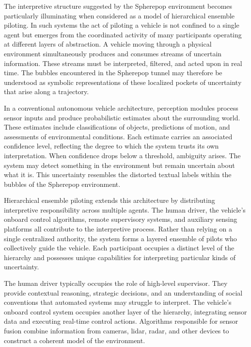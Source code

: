 \documentclass[11pt]{article}
\begin{document}
The interpretive structure suggested by the Spherepop environment becomes particularly illuminating when considered as a model of hierarchical ensemble piloting. In such systems the act of piloting a vehicle is not confined to a single agent but emerges from the coordinated activity of many participants operating at different layers of abstraction. A vehicle moving through a physical environment simultaneously produces and consumes streams of uncertain information. These streams must be interpreted, filtered, and acted upon in real time. The bubbles encountered in the Spherepop tunnel may therefore be understood as symbolic representations of these localized pockets of uncertainty that arise along a trajectory.

In a conventional autonomous vehicle architecture, perception modules process sensor inputs and produce probabilistic estimates about the surrounding world. These estimates include classifications of objects, predictions of motion, and assessments of environmental conditions. Each estimate carries an associated confidence level, reflecting the degree to which the system trusts its own interpretation. When confidence drops below a threshold, ambiguity arises. The system may detect something in the environment but remain uncertain about what it is. This uncertainty resembles the distorted textual labels within the bubbles of the Spherepop environment.

Hierarchical ensemble piloting extends this architecture by distributing interpretive responsibility across multiple agents. The human driver, the vehicle’s onboard control algorithms, remote supervisory systems, and auxiliary sensing platforms all contribute to the interpretive process. Rather than relying on a single centralized authority, the system forms a layered ensemble of pilots who collectively guide the vehicle. Each participant occupies a distinct level of the hierarchy and possesses unique capabilities for interpreting particular kinds of uncertainty.

The human driver typically occupies the role of high-level supervisor. They provide contextual reasoning, strategic decisions, and an understanding of social conventions that automated systems may struggle to interpret. The vehicle’s onboard control system occupies another layer of the hierarchy, integrating sensor data and executing real-time control actions. Algorithms responsible for sensor fusion combine information from cameras, lidar, radar, and other devices to construct a coherent model of the environment.
\end{document}

